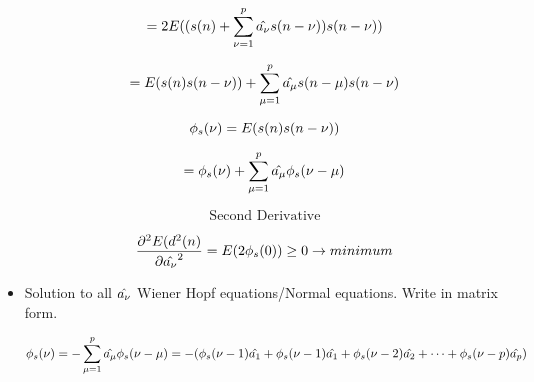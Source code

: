 \begin{itemize}
\begin{equation*}=2E((s(n) + \sum_{\nu =  1}^{p}\hat{a_{\nu}}s(n - \nu))s(n - \nu))\end{equation*}


\begin{equation*}= E(s(n)s(n - \nu))+  \sum_{\mu =  1}^{p}\hat{a_{\mu}}s(n - \mu)s(n - \nu) \end{equation*}

\begin{equation*}\phi_{s}(\nu) =  E(s(n)s(n - \nu))\end{equation*}


\begin{equation*}=\phi_{s}(\nu) + \sum_{\mu =  1}^{p}\hat{a_{\mu}}\phi_{s}(\nu -\mu) \end{equation*}


\begin{equation*}\mbox{Second Derivative}\end{equation*}


\begin{equation*} \frac{\partial^2E(d^2(n)}{\partial\hat{a_{\nu}}^2}=E(2\phi_{s}(0))\geq 0 \rightarrow minimum\end{equation*}

\item Solution to all \begin{math}\hat{a_{\nu}}\end{math} Wiener Hopf equations/Normal equations. Write in matrix form.

\begin{equation*}\phi_{s}(\nu)=-\sum_{\mu =  1}^{p}\hat{a_{\mu}}\phi_{s}(\nu -\mu)=-(\phi_{s}(\nu-1)\hat{a_1} + \phi_{s}(\nu-1)\hat{a_1} + \phi_{s}(\nu-2)\hat{a_2} + \dots +\phi_{s}(\nu-p)\hat{a_p} )\end{equation*}


\end{itemize}
